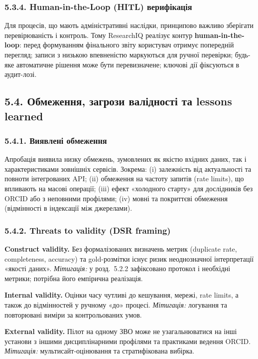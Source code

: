 \subsubsection*{5.3.4. Human-in-the-Loop (HITL) верифікація}

Для процесів, що мають адміністративні наслідки, принципово важливо зберігати перевірюваність і контроль. Тому ResearchIQ реалізує контур \textbf{human-in-the-loop}: перед формуванням фінального звіту користувач отримує попередній перегляд; записи з низькою впевненістю маркуються для ручної перевірки; будь-яке автоматичне рішення може бути перевизначене; ключові дії фіксуються в аудит-лозі.

\subsection*{5.4. Обмеження, загрози валідності та lessons learned}

\subsubsection*{5.4.1. Виявлені обмеження}

Апробація виявила низку обмежень, зумовлених як якістю вхідних даних, так і характеристиками зовнішніх сервісів. Зокрема: (i) залежність від актуальності та повноти інтегрованих API; (ii) обмеження на частоту запитів (rate limits), що впливають на масові операції; (iii) ефект «холодного старту» для дослідників без ORCID або з неповними профілями; (iv) мовні та покриттєві обмеження (відмінності в індексації між джерелами).

\subsubsection*{5.4.2. Threats to validity (DSR framing)}

\textbf{Construct validity.} Без формалізованих визначень метрик (duplicate rate, completeness, accuracy) та gold-розмітки існує ризик неоднозначної інтерпретації «якості даних». \textit{Мітигація:} у розд.~5.2.2 зафіксовано протокол і необхідні метрики; потрібна його емпірична реалізація.

\textbf{Internal validity.} Оцінки часу чутливі до кешування, мережі, rate limits, а також до відмінностей у ручному «до» процесі. \textit{Мітигація:} логування та повторювані виміри за контрольованих умов.

\textbf{External validity.} Пілот на одному ЗВО може не узагальнюватися на інші установи з іншими дисциплінарними профілями та практиками ведення ORCID. \textit{Мітигація:} мультисайт-оцінювання та стратифікована вибірка.

